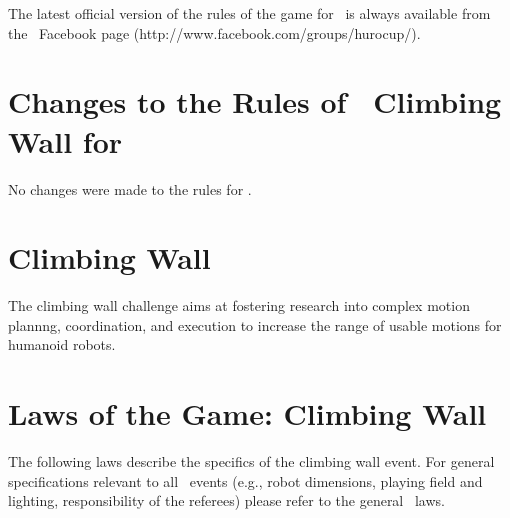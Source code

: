\documentclass[12pt]{hurocup}
\begin{document}
The latest official version of the rules of the game for \HuroCup\ is
always available from the \HuroCup\ Facebook page
(http://www.facebook.com/groups/hurocup/).

\section*{Changes to the Rules of \HuroCup\ Climbing Wall for \thisyear}

No changes were made to the rules for \thisyear.

\newpage

\section{Climbing Wall}
\label{sec:climbing-wall}

The climbing wall challenge aims at fostering research into complex
motion plannng, coordination, and execution to increase the range of
usable motions for humanoid robots.

\section{Laws of the Game: Climbing Wall}
\label{sec:laws-climbing-wall}

The following laws describe the specifics of the climbing wall
event. For general specifications relevant to all \HuroCup\ events
(e.g., robot dimensions, playing field and lighting, responsibility of
the referees) please refer to the general \HuroCup\ laws.

\label{law:field-of-play}
\end{document}
